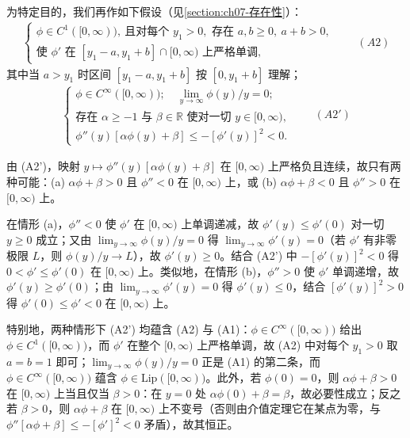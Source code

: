 ﻿\documentclass[../../main.tex]{subfiles}%
\begin{document}
为特定目的，我们再作如下假设（见\cref{section:ch07-存在性}）：
\begin{align*}
\begin{cases}
\phi\in C^1([0,\infty)),\ \text{且对每个 }y_1>0,\text{ 存在 }a,b\geqslant0,\ a+b>0,\\
\text{使 }\phi'\text{ 在 }[y_1-a,y_1+b]\cap[0,\infty)\text{ 上严格单调},
\end{cases}
\qquad(A2)
\end{align*}
其中当 $a>y_1$ 时区间 $[y_1-a,y_1+b]$ 按 $[0,y_1+b]$ 理解；
\begin{align*}
\begin{cases}
\phi\in C^\infty([0,\infty));\quad \lim_{y\to\infty}\phi(y)/y=0;\\
\text{存在 }\alpha\geqslant-1\text{ 与 }\beta\in\mathbb{R}\text{ 使对一切 }y\in[0,\infty),\\
\phi''(y)[\alpha\phi(y)+\beta]\leqslant-[\phi'(y)]^2<0.
\end{cases}
\qquad(A2')
\end{align*}

\begin{remark}\label{remark:ch07-7.1.1}
由 (A2')，映射 $y\mapsto\phi''(y)[\alpha\phi(y)+\beta]$ 在 $[0,\infty)$ 上严格负且连续，故只有两种可能：(a) $\alpha\phi+\beta>0$ 且 $\phi''<0$ 在 $[0,\infty)$ 上，或 (b) $\alpha\phi+\beta<0$ 且 $\phi''>0$ 在 $[0,\infty)$ 上。

在情形 (a)，$\phi''<0$ 使 $\phi'$ 在 $[0,\infty)$ 上单调递减，故 $\phi'(y)\leqslant\phi'(0)$ 对一切 $y\geqslant0$ 成立；又由 $\lim_{y\to\infty}\phi(y)/y=0$ 得 $\lim_{y\to\infty}\phi'(y)=0$（若 $\phi'$ 有非零极限 $L$，则 $\phi(y)/y\to L$），故 $\phi'(y)\geqslant0$。结合 (A2') 中 $-[\phi'(y)]^2<0$ 得 $0<\phi'\leqslant\phi'(0)$ 在 $[0,\infty)$ 上。类似地，在情形 (b)，$\phi''>0$ 使 $\phi'$ 单调递增，故 $\phi'(y)\geqslant\phi'(0)$；由 $\lim_{y\to\infty}\phi'(y)=0$ 得 $\phi'(y)\leqslant0$，结合 $[\phi'(y)]^2>0$ 得 $\phi'(0)\leqslant\phi'<0$ 在 $[0,\infty)$ 上。

特别地，两种情形下 (A2') 均蕴含 (A2) 与 (A1)：$\phi\in C^\infty([0,\infty))$ 给出 $\phi\in C^1([0,\infty))$，而 $\phi'$ 在整个 $[0,\infty)$ 上严格单调，故 (A2) 中对每个 $y_1>0$ 取 $a=b=1$ 即可；$\lim_{y\to\infty}\phi(y)/y=0$ 正是 (A1) 的第二条，而 $\phi\in C^\infty([0,\infty))$ 蕴含 $\phi\in\mathrm{Lip}([0,\infty))$。此外，若 $\phi(0)=0$，则 $\alpha\phi+\beta>0$ 在 $[0,\infty)$ 上当且仅当 $\beta>0$：在 $y=0$ 处 $\alpha\phi(0)+\beta=\beta$，故必要性成立；反之若 $\beta>0$，则 $\alpha\phi+\beta$ 在 $[0,\infty)$ 上不变号（否则由介值定理它在某点为零，与 $\phi''[\alpha\phi+\beta]\leqslant-[\phi']^2<0$ 矛盾），故其恒正。
\end{remark}
\end{document}
